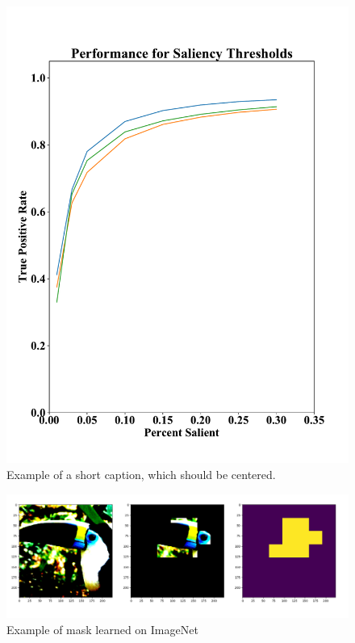 \documentclass[10pt,twocolumn,letterpaper]{article}
\begin{document}
\begin{figure}
\begin{center}
\includegraphics[width=\columnwidth]{figures/tpr.pdf}

\end{center}
   \caption{Example of a short caption, which should be centered.}
\label{fig:short}
\end{figure}


\begin{figure}
	\begin{center}
		\includegraphics[width=\columnwidth]{figures/bird_mask_predict.png}
		
	\end{center}
	\caption{Example of mask learned on ImageNet}
	\label{fig:short}
\end{figure}
\end{document}
